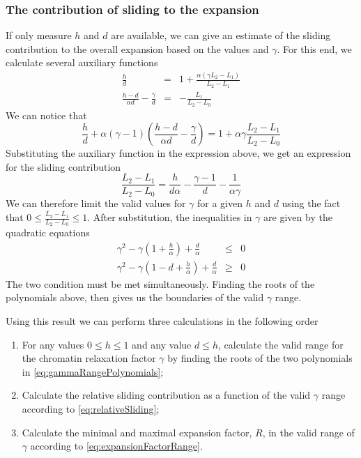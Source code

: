 \documentclass[12pt]{report}
\begin{document}
\subsubsection{The contribution of sliding to the expansion}    
If only measure $h$ and $d$ are available, we can give an estimate of the sliding contribution to the overall expansion based on the values and $\gamma$. For this end, we calculate several auxiliary functions
\begin{eqnarray*}
\frac{h}{d}&=& 1+\frac{\alpha\left(\gamma L_2-L_1\right)}{L_2-L_1}\\
\frac{h-d}{\alpha d} -\frac{\gamma}{d}&=& -\frac{L_1}{L_2-L_0}
\end{eqnarray*} 
We can notice that 
\begin{equation*}
\frac{h}{d}+\alpha(\gamma-1)\left(\frac{h-d}{\alpha d} -\frac{\gamma}{d}\right)=1+\alpha\gamma\frac{L_2-L_1}{L_2-L_0}
\end{equation*}
Substituting the auxiliary function in the expression above, we get an expression for the sliding contribution
\begin{equation}\label{eq:relativeSliding}
\frac{L_2-L_1}{L_2-L_0}=\frac{h}{d\alpha} -\frac{\gamma-1}{d}-\frac{1}{\alpha \gamma}
\end{equation} 
We can therefore limit the valid values for $\gamma$ for a given $h$ and $d$ using the fact that $0\leq \frac{L_2-L_1}{L_2-L_0}\leq 1$. After substitution, the inequalities in $\gamma$ are given by the quadratic equations 
\begin{eqnarray}\label{eq:gammaRangePolynomials}
\gamma^2 -\gamma\left(1+\frac{h}{\alpha}\right)+\frac{d}{\alpha}&\leq& 0\\
\gamma^2 -\gamma\left(1-d +\frac{h}{\alpha}\right)+\frac{d}{\alpha}&\geq& 0 
\end{eqnarray}
 The two condition must be met simultaneously. Finding the roots of the polynomials above, then gives us the boundaries of the valid $\gamma$ range.
   
 Using this result we can perform three calculations in the following order
 \begin{enumerate}
 \item For any values $0\leq h\leq 1$ and any value $d\leq h$, calculate the valid range for the chromatin relaxation factor $\gamma$ by finding the roots of the two polynomials in \ref{eq:gammaRangePolynomials};
 \item Calculate the relative sliding contribution as a function of the valid $\gamma$ range according to \ref{eq:relativeSliding};
 \item Calculate the minimal and maximal expansion factor, $R$, in the valid range of $\gamma$ according to \ref{eq:expansionFactorRange}.
 \end{enumerate}
 
\end{document}
